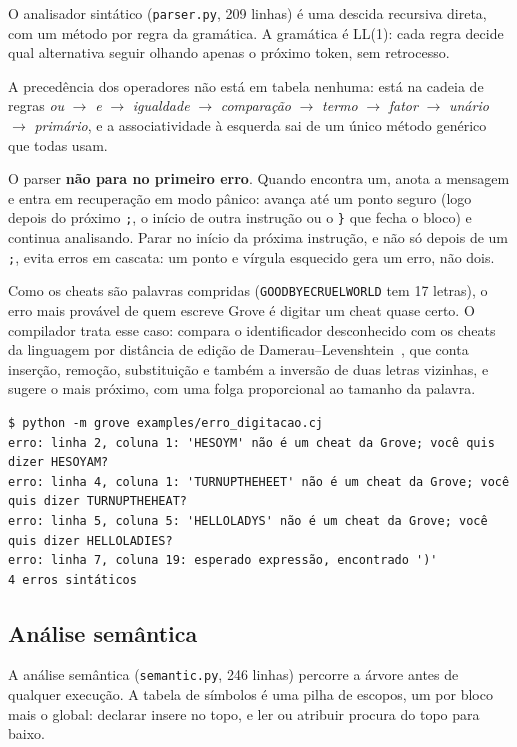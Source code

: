 \documentclass[conference]{IEEEtran}
\begin{document}
O analisador sintático (\texttt{parser.py}, 209 linhas) é uma descida recursiva direta, com um método por regra da gramática. A gramática é LL(1): cada regra decide qual alternativa seguir olhando apenas o próximo token, sem retrocesso.

A precedência dos operadores não está em tabela nenhuma: está na cadeia de regras \emph{ou} $\rightarrow$ \emph{e} $\rightarrow$ \emph{igualdade} $\rightarrow$ \emph{comparação} $\rightarrow$ \emph{termo} $\rightarrow$ \emph{fator} $\rightarrow$ \emph{unário} $\rightarrow$ \emph{primário}, e a associatividade à esquerda sai de um único método genérico que todas usam.

O parser \textbf{não para no primeiro erro}. Quando encontra um, anota a mensagem e entra em recuperação em modo pânico: avança até um ponto seguro (logo depois do próximo \texttt{;}, o início de outra instrução ou o \texttt{\}} que fecha o bloco) e continua analisando. Parar no início da próxima instrução, e não só depois de um \texttt{;}, evita erros em cascata: um ponto e vírgula esquecido gera um erro, não dois.

Como os cheats são palavras compridas (\texttt{GOODBYECRUELWORLD} tem 17 letras), o erro mais provável de quem escreve Grove é digitar um cheat quase certo. O compilador trata esse caso: compara o identificador desconhecido com os cheats da linguagem por distância de edição de Damerau--Levenshtein~\cite{damerau}, que conta inserção, remoção, substituição e também a inversão de duas letras vizinhas, e sugere o mais próximo, com uma folga proporcional ao tamanho da palavra.

\begin{lstlisting}
$ python -m grove examples/erro_digitacao.cj
erro: linha 2, coluna 1: 'HESOYM' não é um cheat da Grove; você quis dizer HESOYAM?
erro: linha 4, coluna 1: 'TURNUPTHEHEET' não é um cheat da Grove; você quis dizer TURNUPTHEHEAT?
erro: linha 5, coluna 5: 'HELLOLADYS' não é um cheat da Grove; você quis dizer HELLOLADIES?
erro: linha 7, coluna 19: esperado expressão, encontrado ')'
4 erros sintáticos
\end{lstlisting}

\subsection{Análise semântica}

A análise semântica (\texttt{semantic.py}, 246 linhas) percorre a árvore antes de qualquer execução. A tabela de símbolos é uma pilha de escopos, um por bloco mais o global: declarar insere no topo, e ler ou atribuir procura do topo para baixo.
\end{document}
